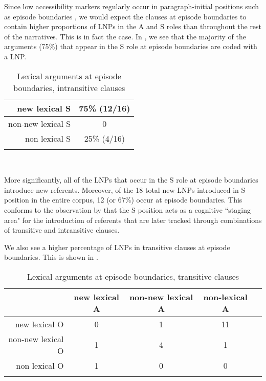 Since low accessibility markers regularly occur in paragraph-initial positions such as episode boundaries \citep[52]{ariel2001}, we would expect the clauses at episode boundaries to contain higher proportions of LNPs in the A and S roles than throughout the rest of the narratives. This is in fact the case. In , we see that the majority of the arguments (75{\%}) that appear in the S role at episode boundaries are coded with a LNP. 

\begin{table} 

\caption{{Lexical arguments at episode boundaries, intransitive clauses}}
\begin{tabular}{ r  c }
\lsptoprule
new lexical S & 75{\%} (12/16) \\

\midrule
non-new lexical S & 0 \\

\midrule
non lexical S & 25{\%} (4/16)  \\

\lspbottomrule
\end{tabular}\\
\label{episodeintr}

\end{table}

More significantly, all of the LNPs that occur in the S role at episode boundaries introduce new referents. Moreover, of the 18 total new LNPs introduced in S position in the entire corpus, 12 (or 67{\%}) occur at episode boundaries. This conforms to the observation by \citet[831]{dubois1987} that the S position acts as a cognitive ``staging area" for the introduction of referents that are later tracked through combinations of transitive and intransitive clauses.

We also see a higher percentage of LNPs in transitive clauses at episode boundaries. This is shown in .

\begin{table}

\caption{{Lexical arguments at episode boundaries, transitive clauses}}
\begin{tabular}{ r  c  c  c  c }
\lsptoprule
 & new lexical A & non-new lexical A & non-lexical A \\

\midrule
new lexical O & 0 & 1 & 11 \\

\midrule
non-new lexical O & 1 & 4  & 1  \\

\midrule
non lexical O & 1 &  0 & 0  \\

\lspbottomrule
\end{tabular}\\
\label{episodetr}

\end{table}

